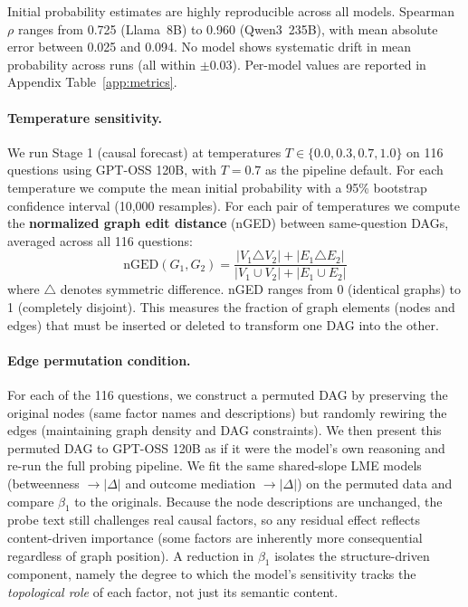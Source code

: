 \documentclass[11pt]{article}
\begin{document}
Initial probability estimates are highly reproducible across all models. Spearman $\rho$ ranges from 0.725 (Llama~8B) to 0.960 (Qwen3~235B), with mean absolute error between 0.025 and 0.094. No model shows systematic drift in mean probability across runs (all within $\pm$0.03). Per-model values are reported in Appendix Table~\ref{app:metrics}.

\paragraph{Temperature sensitivity.} We run Stage 1 (causal forecast) at temperatures $T \in \{0.0, 0.3, 0.7, 1.0\}$ on 116 questions using GPT-OSS 120B, with $T = 0.7$ as the pipeline default. For each temperature we compute the mean initial probability with a 95\% bootstrap confidence interval (10,000 resamples). For each pair of temperatures we compute the \textbf{normalized graph edit distance} (nGED) between same-question DAGs, averaged across all 116 questions:
\begin{equation}
    \text{nGED}(G_1, G_2) = \frac{|V_1 \triangle V_2| + |E_1 \triangle E_2|}{|V_1 \cup V_2| + |E_1 \cup E_2|}
\end{equation}
where $\triangle$ denotes symmetric difference. nGED ranges from 0 (identical graphs) to 1 (completely disjoint). This measures the fraction of graph elements (nodes and edges) that must be inserted or deleted to transform one DAG into the other.

\paragraph{Edge permutation condition.} For each of the 116 questions, we construct a permuted DAG by preserving the original nodes (same factor names and descriptions) but randomly rewiring the edges (maintaining graph density and DAG constraints). We then present this permuted DAG to GPT-OSS 120B as if it were the model's own reasoning and re-run the full probing pipeline. We fit the same shared-slope LME models (betweenness $\rightarrow |\Delta|$ and outcome mediation $\rightarrow |\Delta|$) on the permuted data and compare $\beta_1$ to the originals. Because the node descriptions are unchanged, the probe text still challenges real causal factors, so any residual effect reflects content-driven importance (some factors are inherently more consequential regardless of graph position). A reduction in $\beta_1$ isolates the structure-driven component, namely the degree to which the model's sensitivity tracks the \emph{topological role} of each factor, not just its semantic content.
\end{document}
